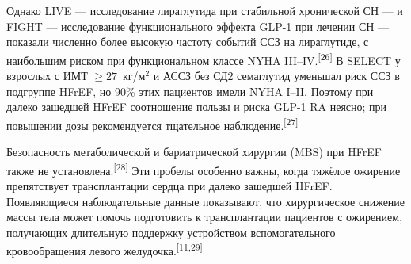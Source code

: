 \documentclass[11pt,a4paper]{article}
\newcommand{\src}[1]{\textsuperscript{[#1]}}
\begin{document}
Однако LIVE --- исследование лираглутида при стабильной хронической СН --- и FIGHT --- исследование функционального эффекта GLP-1 при лечении СН --- показали численно более высокую частоту событий ССЗ на лираглутиде, с наибольшим риском при функциональном классе NYHA III--IV.\src{26} В SELECT у взрослых с ИМТ $\geq27$~кг/м$^2$ и АССЗ без СД2 семаглутид уменьшал риск ССЗ в подгруппе HFrEF, но 90\% этих пациентов имели NYHA I--II. Поэтому при далеко зашедшей HFrEF соотношение пользы и риска GLP-1 RA неясно; при повышении дозы рекомендуется тщательное наблюдение.\src{27}

Безопасность метаболической и бариатрической хирургии (MBS) при HFrEF также не установлена.\src{28} Эти пробелы особенно важны, когда тяжёлое ожирение препятствует трансплантации сердца при далеко зашедшей HFrEF. Появляющиеся наблюдательные данные показывают, что хирургическое снижение массы тела может помочь подготовить к трансплантации пациентов с ожирением, получающих длительную поддержку устройством вспомогательного кровообращения левого желудочка.\src{11,29}
\end{document}
